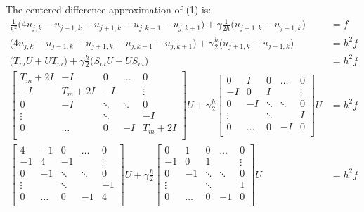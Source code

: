 \documentclass[12pt]{article}
\begin{document}
The centered difference approximation of (1) is:
\begin{align*}
\frac{1}{h^2}\bigg(4u_{j,k} - u_{j-1,k} - u_{j+1,k} - u_{j,k-1} - u_{j,k+1}\bigg) +\gamma\frac{1}{2h}\bigg(u_{j+1,k} - u_{j-1,k}\bigg) &= f \\
\bigg(4u_{j,k} - u_{j-1,k} - u_{j+1,k} - u_{j,k-1} - u_{j,k+1}\bigg) + \gamma\frac{h}{2}\bigg(u_{j+1,k} - u_{j-1,k}\bigg) &= h^2f \\
\bigg(T_mU + UT_m\bigg) + \gamma\frac{h}{2}\bigg(S_mU + US_m\bigg) &= h^2f \\
\begin{bmatrix}
T_m + 2I & -I & 0 & \hdots & 0 \\
-I & T_m + 2I & -I &  & \vdots\\
0 & -I & \ddots & \ddots & 0\\
\vdots &  & \ddots & & -I \\
0 & \hdots & 0 & -I & T_m + 2I \\
\end{bmatrix}U + \gamma\frac{h}{2}\begin{bmatrix}
0 & I & 0 & \hdots & 0 \\
-I & 0 & I &  & \vdots\\
0 & -I & \ddots & \ddots & 0\\
\vdots &  & \ddots & & I \\
0 & \hdots & 0 & -I & 0 \\
\end{bmatrix}U & = h^2f \\
\begin{bmatrix}
4 & -1 & 0 & \hdots & 0 \\
-1 & 4 & -1 &  & \vdots\\
0 & -1 & \ddots & \ddots & 0\\
\vdots &  & \ddots & & -1 \\
0 & \hdots & 0 & -1 & 4 \\
\end{bmatrix}U + \gamma\frac{h}{2}\begin{bmatrix}
0 & 1 & 0 & \hdots & 0 \\
-1 & 0 & 1 &  & \vdots\\
0 & -1 & \ddots & \ddots & 0\\
\vdots &  & \ddots & & 1 \\
0 & \hdots & 0 & -1 & 0 \\
\end{bmatrix}U & = h^2f
\end{align*}
\end{document}
